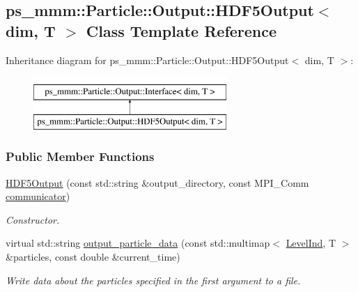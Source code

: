 \hypertarget{classps__mmm_1_1_particle_1_1_output_1_1_h_d_f5_output}{}\subsection{ps\+\_\+mmm\+:\+:Particle\+:\+:Output\+:\+:H\+D\+F5\+Output$<$ dim, T $>$ Class Template Reference}
\label{classps__mmm_1_1_particle_1_1_output_1_1_h_d_f5_output}
Inheritance diagram for ps\+\_\+mmm\+:\+:Particle\+:\+:Output\+:\+:H\+D\+F5\+Output$<$ dim, T $>$\+:\begin{figure}[H]
\begin{center}
\leavevmode
\includegraphics[height=2.000000cm]{classps__mmm_1_1_particle_1_1_output_1_1_h_d_f5_output}
\end{center}
\end{figure}
\subsubsection*{Public Member Functions}
\begin{DoxyCompactItemize}
\item 
\hyperlink{classps__mmm_1_1_particle_1_1_output_1_1_h_d_f5_output_a93055d504bdcc9376d0adb72ce854158}{H\+D\+F5\+Output} (const std\+::string \&output\+\_\+directory, const M\+P\+I\+\_\+\+Comm \hyperlink{classps__mmm_1_1_particle_1_1_output_1_1_interface_ae3fcfd82092c40864ec09918f03b91d0}{communicator})
\begin{DoxyCompactList}\small\item\em Constructor. \end{DoxyCompactList}\item 
virtual std\+::string \hyperlink{classps__mmm_1_1_particle_1_1_output_1_1_h_d_f5_output_a7a60a4d5d9abcf5f2b8f652b69f4dbe1}{output\+\_\+particle\+\_\+data} (const std\+::multimap$<$ \hyperlink{namespaceps__mmm_1_1_particle_a475174140997ceb63cc9e801b6c0c4b8}{Level\+Ind}, T $>$ \&particles, const double \&current\+\_\+time)
\begin{DoxyCompactList}\small\item\em Write data about the particles specified in the first argument to a file. \end{DoxyCompactList}\end{DoxyCompactItemize}
